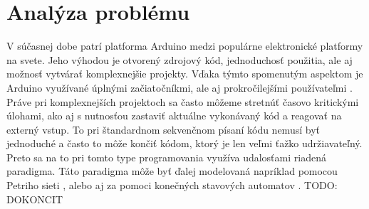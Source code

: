 \section{Analýza problému}
V súčasnej dobe patrí platforma Arduino medzi populárne elektronické platformy na svete. Jeho výhodou je otvorený zdrojový kód, jednoduchosť použitia, ale aj možnosť vytvárať komplexnejšie projekty. Vďaka týmto spomenutým aspektom je Arduino využívané úplnými začiatočníkmi, ale aj prokročilejšími používateľmi \cite{WhatArduinoArduino}.
 Práve pri komplexnejších projektoch sa často môžeme stretnúť časovo kritickými 
 úlohami, ako aj s nutnosťou zastaviť aktuálne vykonávaný kód a reagovať na externý vstup. To pri štandardnom sekvenčnom písaní kódu nemusí byť jednoduché a často to môže končiť kódom, ktorý je len veľmi ťažko udržiavateľný. Preto sa na to pri tomto type programovania využíva udalosťami riadená paradigma. Táto paradigma môže byť ďalej modelovaná napríklad pomocou Petriho sieti \cite{bastidePetriNetBased1995}, alebo aj za pomoci konečných stavových automatov \cite{dashEventDrivenProgramming2011}.
 TODO: DOKONCIT 